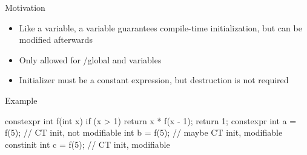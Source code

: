 \begin{frame}[fragile]
  \begin{block}{Motivation}
    \begin{itemize}
    \item Like a  variable, a  variable guarantees compile-time initialization, but can be modified afterwards
    \item Only allowed for /global and  variables
    \item Initializer must be a constant expression, but  destruction is not required
    \end{itemize}
  \end{block}
  \begin{exampleblock}{Example}
    \begin{cppcode}
      constexpr int f(int x) {
        if (x > 1) return x * f(x - 1);
        return 1;
      }
      constexpr int a = f(5); // CT init, not modifiable
      int b           = f(5); // maybe CT init, modifiable
      constinit int c = f(5); // CT init, modifiable
    \end{cppcode}
  \end{exampleblock}
\end{frame}
